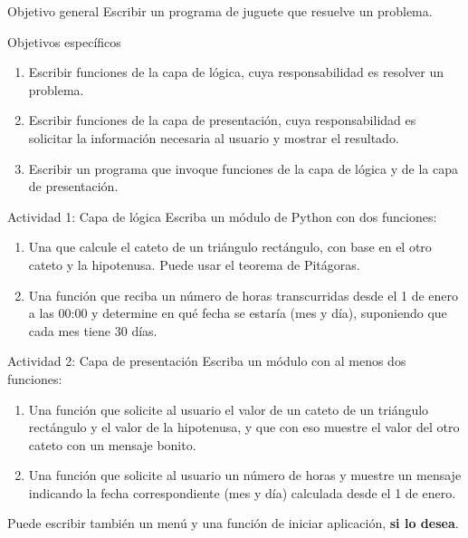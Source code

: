 \documentclass{ip-lab}
\begin{document}
\maketitle

\begin{sectionbox}{Objetivo general}
Escribir un programa de juguete que resuelve un problema.
\end{sectionbox}

\begin{sectionbox}{Objetivos específicos}
\begin{enumerate}
    \item Escribir funciones de la capa de lógica, cuya responsabilidad es resolver un problema.
    \item Escribir funciones de la capa de presentación, cuya responsabilidad es solicitar la información necesaria al usuario y mostrar el resultado.
    \item Escribir un programa que invoque funciones de la capa de lógica y de la capa de presentación.
\end{enumerate}
\end{sectionbox}

\begin{sectionbox}{Actividad 1: Capa de lógica}
Escriba un módulo de Python con dos funciones:
\begin{enumerate}
    \item Una que calcule el cateto de un triángulo rectángulo, con base en el otro cateto y la hipotenusa. Puede usar el teorema de Pitágoras.
    \item Una función que reciba un número de horas transcurridas desde el 1 de enero a las 00:00 y determine en qué fecha se estaría (mes y día), suponiendo que cada mes tiene 30 días.
\end{enumerate}
\end{sectionbox}

\begin{sectionbox}{Actividad 2: Capa de presentación}
Escriba un módulo con al menos dos funciones:
\begin{enumerate}
    \item Una función que solicite al usuario el valor de un cateto de un triángulo rectángulo y el valor de la hipotenusa, y que con eso muestre el valor del otro cateto con un mensaje bonito.
    \item Una función que solicite al usuario un número de horas y muestre un mensaje indicando la fecha correspondiente (mes y día) calculada desde el 1 de enero.
\end{enumerate}
Puede escribir también un menú y una función de iniciar aplicación, \textbf{si lo desea}. 
\end{sectionbox}
\end{document}
